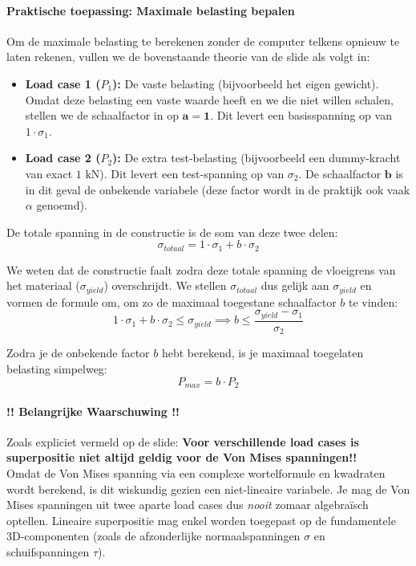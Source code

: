 \documentclass[a4paper,11pt,twoside]{report}
\begin{document}
\paragraph{Praktische toepassing: Maximale belasting bepalen}
Om de maximale belasting te berekenen zonder de computer telkens opnieuw te laten rekenen, vullen we
de bovenstaande theorie van de slide als volgt in:
\begin{itemize}
    \item \textbf{Load case 1 ($P_1$):} De vaste belasting (bijvoorbeeld het eigen gewicht). Omdat
          deze belasting een vaste waarde heeft en we die niet willen schalen, stellen we de schaalfactor
          in op $\boldsymbol{a = 1}$. Dit levert een basisspanning op van $1 \cdot \sigma_1$.
    \item \textbf{Load case 2 ($P_2$):} De extra test-belasting (bijvoorbeeld een dummy-kracht van
          exact $1\text{ kN}$). Dit levert een test-spanning op van $\sigma_2$. De schaalfactor
          $\boldsymbol{b}$ is in dit geval de onbekende variabele (deze factor wordt in de praktijk ook
          vaak $\alpha$ genoemd).
\end{itemize}

De totale spanning in de constructie is de som van deze twee delen:
\begin{equation*}
    \sigma_{totaal} = 1 \cdot \sigma_1 + b \cdot \sigma_2
\end{equation*}

We weten dat de constructie faalt zodra deze totale spanning de vloeigrens van het materiaal
($\sigma_{yield}$) overschrijdt. We stellen $\sigma_{totaal}$ dus gelijk aan $\sigma_{yield}$ en
vormen de formule om, om zo de maximaal toegestane schaalfactor $b$ te vinden:
\begin{equation*}
    1 \cdot \sigma_1 + b \cdot \sigma_2 \le \sigma_{yield} \implies b \le \frac{\sigma_{yield} - \sigma_1}{\sigma_2}
\end{equation*}

Zodra je de onbekende factor $b$ hebt berekend, is je maximaal toegelaten belasting simpelweg:
\begin{equation*}
    P_{max} = b \cdot P_2
\end{equation*}

\paragraph{!! Belangrijke Waarschuwing !!}
Zoals expliciet vermeld op de slide: \textbf{Voor verschillende load cases is superpositie niet
    altijd geldig voor de Von Mises spanningen!!} \\
Omdat de Von Mises spanning via een complexe wortelformule en kwadraten wordt berekend, is dit
wiskundig gezien een niet-lineaire variabele. Je mag de Von Mises spanningen uit twee aparte load
cases dus \textit{nooit} zomaar algebraïsch optellen. Lineaire superpositie mag enkel worden
toegepast op de fundamentele 3D-componenten (zoals de afzonderlijke normaalspanningen $\sigma$ en
schuifspanningen $\tau$).
\end{document}
